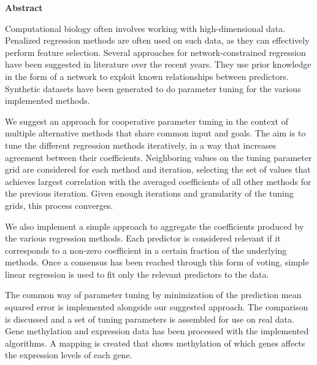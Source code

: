 \newpage
{\Huge \bf Abstract}
\vspace{24pt} 

Computational biology often involves working with high-dimensional data. Penalized regression methods are often used on such data, as they can effectively perform feature selection. Several approaches for network-constrained regression have been suggested in literature over the recent years. They use prior knowledge in the form of a network to exploit known relationships between predictors. Synthetic datasets have been generated to do parameter tuning for the various implemented methods. 

We suggest an approach for cooperative parameter tuning in the context of multiple alternative methods that share common input and goals. The aim is to tune the different regression methods iteratively, in a way that increases agreement between their coefficients. Neighboring values on the tuning parameter grid are considered for each method and iteration, selecting the set of values that achieves largest correlation with the averaged coefficients of all other methods for the previous iteration. Given enough iterations and granularity of the tuning grids, this process converges.

We also implement a simple approach to aggregate the coefficients produced by the various regression methods. Each predictor is considered relevant if it corresponds to a non-zero coefficient in a certain fraction of the underlying methods. Once a consensus has been reached through this form of voting, simple linear regression is used to fit only the relevant predictors to the data.

The common way of parameter tuning by minimization of the prediction mean squared error is implemented alongside our suggested approach. The comparison is discussed and a set of tuning parameters is assembled for use on real data. Gene methylation and expression data has been processed with the implemented algorithms. A mapping is created that shows methylation of which genes affects the expression levels of each gene.

\newpage
\vspace*{\fill}
